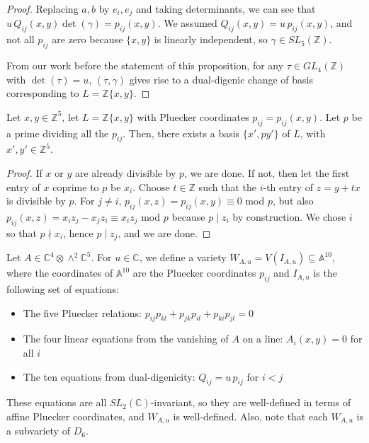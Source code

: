 \documentclass{report}
\begin{document}
\begin{proof}
Replacing $a,b$ by $e_i, e_j$ and taking determinants, we can see that $u \, Q_{ij}(x,y) \det(\gamma) = p_{ij}(x,y)$.  We assumed $Q_{ij}(x,y) = u \, p_{ij}(x,y)$, and not all $p_{ij}$ are zero because $\{x,y\}$ is linearly independent, so $\gamma \in SL_5(\mathbb{Z})$.

From our work before the statement of this proposition, for any $\tau \in GL_4(\mathbb{Z})$ with $\det(\tau) = u$, $(\tau,\gamma)$ gives rise to a dual-digenic change of basis corresponding to $L = \mathbb{Z}\{x,y\}$.
\end{proof}

\begin{lemma} \label{pij primitive}
Let $x,y \in \mathbb{Z}^5$, let $L = \mathbb{Z}\{x,y\}$ with Pluecker coordinates $p_{ij} = p_{ij}(x,y)$.  Let $p$ be a prime dividing all the $p_{ij}$.  Then, there exists a basis $\{x', p y'\}$ of $L$, with $x',y' \in \mathbb{Z}^5$.
\end{lemma}
\begin{proof}
If $x$ or $y$ are already divisible by $p$, we are done.  If not, then let the first entry of $x$ coprime to $p$ be $x_i$. Choose $t \in \mathbb{Z}$ such that the $i$-th entry of $z = y + t x$ is divisible by $p$.  For $j \neq i$, $p_{ij}(x,z) = p_{ij}(x,y) \equiv 0$ mod $p$, but also $p_{ij}(x,z) = x_i z_j - x_j z_i \equiv x_i z_j$ mod $p$ because $p \mid z_i$ by construction.  We chose $i$ so that $p \nmid x_i$, hence $p \mid z_j$, and we are done.
\end{proof}

Let $A \in \mathbb{C}^4 \otimes \wedge^2 \mathbb{C}^5$.  For $u \in \mathbb{C}$, we define a variety $W_{A,u} = V(I_{A,u}) \subseteq \mathbb{A}^{10}$, where the coordinates of $\mathbb{A}^{10}$ are the Pluecker coordinates $p_{ij}$ and $I_{A,u}$ is the following set of equations:
\begin{itemize}
\item The five Pluecker relations: $p_{ij} p_{kl} + p_{jk} p_{il} + p_{ki} p_{jl} = 0$
\item The four linear equations from the vanishing of $A$ on a line: $A_i(x,y) = 0$ for all $i$
\item The ten equations from dual-digenicity: $Q_{ij} = u \, p_{ij}$ for $i < j$
\end{itemize}

These equations are all $SL_2(\mathbb{C})$-invariant, so they are well-defined in terms of affine Pluecker coordinates, and $W_{A,u}$ is well-defined.  Also, note that each $W_{A,u}$ is a subvariety of $D_6$.
\end{document}

